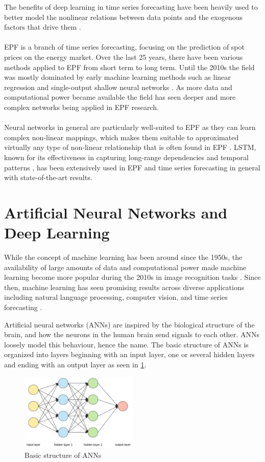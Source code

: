 The benefits of deep learning in time series forecasting have been heavily used to better model the nonlinear relations between data points and the exogenous factors that drive them \cite{LAGO2021116983}.
\\\\
EPF is a branch of time series forecasting, focusing on the prediction of spot prices on the energy market. Over the last 25 years, there have been various methods applied to EPF from short term to long term. Until the 2010s the field was mostly dominated by early machine learning methods such as linear regression and single-output shallow neural networks \cite{dawn}. As more data and computational power became available the field has seen deeper and more complex networks being applied in EPF research\cite{dawn}.  
\\\\
Neural networks in general are particularly well-suited to EPF as they can learn complex non-linear mappings, which makes them suitable to approximated virtually any type of non-linear relationship that is often found in EPF \cite{goodfellow, dawn}. LSTM, known for its effectiveness in capturing long-range dependencies and temporal patterns \cite{stackedlstm}, has been extensively used in EPF and time series forecasting in general with state-of-the-art results\cite{WAGNER2022100246}.

\section{Artificial Neural Networks and Deep Learning} \label{DL}
While the concept of machine learning has been around since the 1950s, the availability of large amounts of data and computational power made machine learning become more popular during the 2010s in image recognition tasks \cite{dlorigin}. Since then, machine learning has seen promising results across diverse applications including natural language processing, computer vision, and time series forecasting \cite{dlorigin}.

Artificial neural networks (ANNs) are inspired by the biological structure of the brain, and how the neurons in the human brain send signals to each other. ANNs loosely model this behaviour, hence the name. The basic structure of ANNs is organized into layers beginning with an input layer, one or several hidden layers and ending with an output layer as seen in \ref{fig:ann}.
\begin{figure}[H]
    \centering
    \includegraphics[width=0.5\textwidth]{figures/ann.png}
    \caption{Basic structure of ANNs \cite{medium_figur}}
    \label{fig:ann}
\end{figure}

